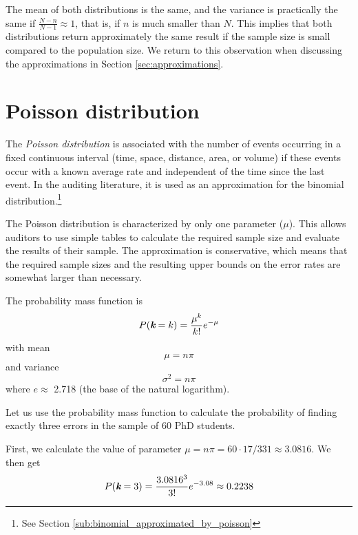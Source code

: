 The mean of both distributions is the same, and the variance is practically the same if $\frac{N - n}{N - 1} \approx 1$, that is, if $n$ is much smaller than $N$. This implies that both distributions return approximately the same result if the sample size is small compared to the population size. We return to this observation when discussing the approximations in Section \ref{sec:approximations}.


\section{Poisson distribution} %
\label{sec:poisson_distribution}

The \emph{Poisson distribution} is associated with the number of events occurring in a fixed continuous interval (time, space, distance, area, or volume) if these events occur with a known average rate and independent of the time since the last event. In the auditing literature, it is used as an approximation for the binomial distribution.\footnote{See Section \ref{sub:binomial_approximated_by_poisson}}

The Poisson distribution is characterized by only one parameter ($\mu$). This allows auditors to use simple tables to calculate the required sample size and evaluate the results of their sample. The approximation is conservative, which means that the required sample sizes and the resulting upper bounds on the error rates are somewhat larger than necessary.

\bigskip
The probability mass function is
\begin{equation}
P(\textit{\textbf{k}} = k) = \frac{\mu^k}{k!}e^{-\mu}
\label{eq:Poisson}
\end{equation}
with mean
\begin{equation}
\mu = n\pi
\end{equation}
and variance
\begin{equation}
\sigma^2 = n\pi
\label{eq:variance_poiss}
\end{equation}
where $e \approx $ 2.718 (the base of the natural logarithm).

\bigskip
Let us use the probability mass function to calculate the probability of finding exactly three errors in the sample of 60 PhD students.

First, we calculate the value of parameter $\mu = n \pi = 60 \cdot 17 / 331 \approx 3.0816$. We then get
\begin{equation*}
P(\textit{\textbf{k}} = 3) = \frac{3.0816^3}{3!}e^{-3.08} \approx 0.2238
\end{equation*}

